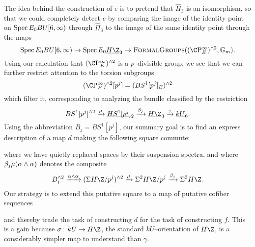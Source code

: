 The idea behind the construction of $e$ is to pretend that $\widehat \Pi_3$ is an isomorphism, so that we could completely detect $e$ by comparing the image of the identity point on $\operatorname{Spec} E_0 BU[6, \infty)$ through $\widehat \Pi_3$ to the image of the same identity point through the maps \[\Spec E_0 BU[6, \infty) \to \Spec E_0 \OS{H\Z}{3} \to \CatOf{FormalGroups}((\CP^\infty_E)^{\sm 2}, \Gm).\]  Using our calculation that $(\CP^\infty_E)^{\sm 2}$ is a $p$--divisible group, we see that we can further restrict attention to the torsion subgroups \[(\CP^\infty_E)^{\sm 2}[p^j] = (BS^1[p^j]_E)^{\sm 2}\] which filter it, corresponding to analyzing the bundle classified by the restriction \[BS^1[p^j]^{\sm 2} \xrightarrow{\mu} \OS{HS^1[p^j]}{2} \xrightarrow{\beta_j} \OS{H\Z}{3} \xrightarrow{\gamma} \OS{kU}{6}.\]  Using the abbreviation $B_j = BS^1[p^j]$, our summary goal is to find an express description of a map $d$ making the following square commute:
\begin{center}
\end{center}
where we have quietly replaced spaces by their suspension spectra, and where $\beta_j \mu(\alpha \wedge \alpha)$ denotes the composite \[B_j^{\sm 2} \xrightarrow{\alpha \sm \alpha} (\Susp H\Z/p^j)^{\sm 2} \xrightarrow{\mu} \Susp^2 H\Z/p^j \xrightarrow{\beta_j} \Susp^3 H\Z.\]  Our strategy is to extend this putative square to a map of putative cofiber sequences
\begin{center}
\end{center}
and thereby trade the task of constructing $d$ for the task of constructing $f$.  This is a gain because $\sigma\co kU \to H\Z$, the standard $kU$--orientation of $H\Z$, is a considerably simpler map to understand than $\gamma$.

